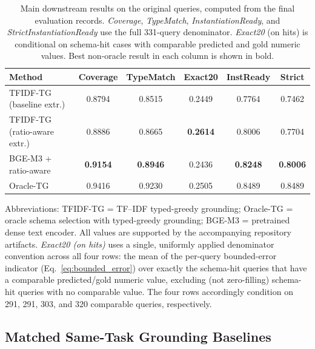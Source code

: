 \documentclass[pdflatex,sn-basic,Numbered]{sn-jnl}
\begin{document}
\begin{table}[t]
  \centering
  \caption{Main downstream results on the original queries, computed from the final evaluation records. \textit{Coverage}, \textit{TypeMatch}, \textit{InstantiationReady}, and \textit{StrictInstantiationReady} use the full 331-query denominator. \textit{Exact20} (on hits) is conditional on schema-hit cases with comparable predicted and gold numeric values. Best non-oracle result in each column is shown in bold.}
  \label{tab:nlp4lp-downstream-main}
  \small
  \setlength{\tabcolsep}{3.2pt}
  \renewcommand{\arraystretch}{1.12}
  \begin{tabular}{@{}lccccc@{}}
    \toprule
    Method & Coverage & TypeMatch & Exact20 & InstReady & Strict \\
    \midrule
    TFIDF-TG (baseline extr.) & 0.8794 & 0.8515 & 0.2449 & 0.7764 & 0.7462 \\
    TFIDF-TG (ratio-aware extr.) & 0.8886 & 0.8665 & \textbf{0.2614} & 0.8006 & 0.7704 \\
    BGE-M3 + ratio-aware & \textbf{0.9154} & \textbf{0.8946} & 0.2436 & \textbf{0.8248} & \textbf{0.8006} \\
    Oracle-TG & 0.9416 & 0.9230 & 0.2505 & 0.8489 & 0.8489 \\
    \bottomrule
  \end{tabular}

  \vspace{2mm}
  \raggedright
  \footnotesize
  Abbreviations: TFIDF-TG = TF--IDF typed-greedy grounding; Oracle-TG = oracle schema selection with typed-greedy grounding; BGE-M3 = pretrained dense text encoder. All values are supported by the accompanying repository artifacts. \textit{Exact20 (on hits)} uses a single, uniformly applied denominator convention across all four rows: the mean of the per-query bounded-error indicator (Eq.~\eqref{eq:bounded_error}) over exactly the schema-hit queries that have a comparable predicted/gold numeric value, excluding (not zero-filling) schema-hit queries with no comparable value. The four rows accordingly condition on 291, 291, 303, and 320 comparable queries, respectively.
\end{table}

\subsection{Matched Same-Task Grounding Baselines}
\label{subsec:exp_grounding_baselines}
\end{document}
